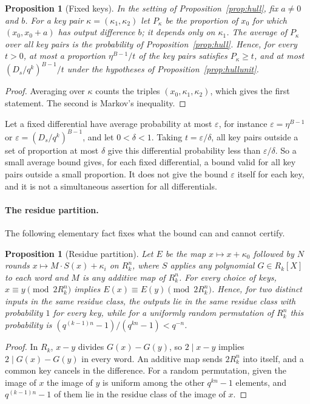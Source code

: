 \documentclass[11pt]{article}
\newtheorem{proposition}[theorem]{Proposition}
\theoremstyle{definition}
\theoremstyle{remark}
\begin{document}
\begin{proposition}[Fixed keys]\label{prop:fixedkey}
In the setting of Proposition~\ref{prop:hull}, fix $a\ne0$ and $b$. For a key pair $\kappa=(\kappa_1,\kappa_2)$ let
$P_\kappa$ be the proportion of $x_0$ for which $(x_0,x_0+a)$ has output difference $b$; it depends only on $\kappa_1$.
The average of $P_\kappa$ over all key pairs is the probability of Proposition~\ref{prop:hull}. Hence, for every
$t>0$, at most a proportion $\eta^{B-1}/t$ of the key pairs satisfies $P_\kappa\ge t$, and at most
$(D_s/q^k)^{B-1}/t$ under the hypotheses of Proposition~\ref{prop:hullunit}.
\end{proposition}
\begin{proof}
Averaging over $\kappa$ counts the triples $(x_0,\kappa_1,\kappa_2)$, which gives the first statement. The second is
Markov's inequality.
\end{proof}

Let a fixed differential have average probability at most $\varepsilon$, for instance $\varepsilon=\eta^{B-1}$ or
$\varepsilon=(D_s/q^k)^{B-1}$, and let $0<\delta<1$. Taking $t=\varepsilon/\delta$, all key pairs outside a set of
proportion at most $\delta$ give this differential probability less than $\varepsilon/\delta$. So a small average
bound gives, for each fixed differential, a bound valid for all key pairs outside a small proportion. It does not give
the bound $\varepsilon$ itself for each key, and it is not a simultaneous assertion for all differentials.

\paragraph{The residue partition.}
The following elementary fact fixes what the bound can and cannot certify.

\begin{proposition}[Residue partition]\label{prop:congpart}
Let $E$ be the map $x\mapsto x+\kappa_0$ followed by $N$ rounds $x\mapsto M\cdot S(x)+\kappa_i$ on $R_k^n$, where $S$
applies any polynomial $G\in R_k[X]$ to each word and $M$ is any additive map of $R_k^n$. For every choice of keys,
$x\equiv y\pmod{2R_k^n}$ implies $E(x)\equiv E(y)\pmod{2R_k^n}$. Hence, for two distinct inputs in the same residue
class, the outputs lie in the same residue class with probability $1$ for every key, while for a uniformly random
permutation of $R_k^n$ this probability is $(q^{(k-1)n}-1)/(q^{kn}-1)<q^{-n}$.
\end{proposition}
\begin{proof}
In $R_k$, $x-y$ divides $G(x)-G(y)$, so $2\mid x-y$ implies $2\mid G(x)-G(y)$ in every word. An additive map sends
$2R_k^n$ into itself, and a common key cancels in the difference. For a random permutation, given the image of $x$
the image of $y$ is uniform among the other $q^{kn}-1$ elements, and $q^{(k-1)n}-1$ of them lie in the residue class
of the image of $x$.
\end{proof}
\end{document}
